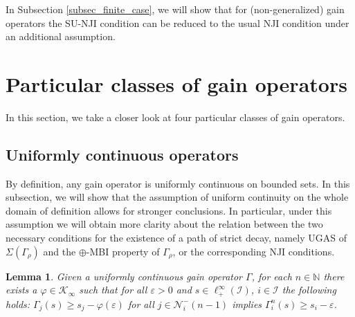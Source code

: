 \documentclass[10pt, oneside, a4paper]{article}
\newcommand{\N}{\mathbb{N}}
\newcommand{\ep}{\varepsilon}
\newcommand{\IC}{\mathcal{I}}
\newcommand{\KC}{\mathcal{K}}
\newcommand{\NC}{\mathcal{N}}
\newtheorem{lemma}{Lemma}[section]
\begin{document}
In Subsection \ref{subsec_finite_case}, we will show that for (non-generalized) gain operators the SU-NJI condition can be reduced to the usual NJI condition under an additional assumption.

\section{Particular classes of gain operators}\label{sec_classes}

In this section, we take a closer look at four particular classes of gain operators.%

\subsection{Uniformly continuous operators}\label{subsec_uniformly_continuous}

By definition, any gain operator is uniformly continuous on bounded sets. In this subsection, we will show that the assumption of uniform continuity on the whole domain of definition allows for stronger conclusions. In particular, under this assumption we will obtain more clarity about the relation between the two necessary conditions for the existence of a path of strict decay, namely UGAS of $\Sigma(\Gamma_{\rho})$ and the $\oplus$-MBI property of $\Gamma_{\rho}$, or the corresponding NJI conditions.%

\begin{lemma}\label{lem_unifcont_op}
Given a uniformly continuous gain operator $\Gamma$, for each $n \in \N$ there exists a $\varphi \in \KC_{\infty}$ such that for all $\ep > 0$ and $s \in \ell^{\infty}_+(\IC)$, $i \in \IC$ the following holds: $\Gamma_j(s) \geq s_j - \varphi(\ep)$ for all $j \in \NC^-_i(n-1)$ implies $\Gamma_i^n(s) \geq s_i - \ep$.
\end{lemma}
\end{document}
